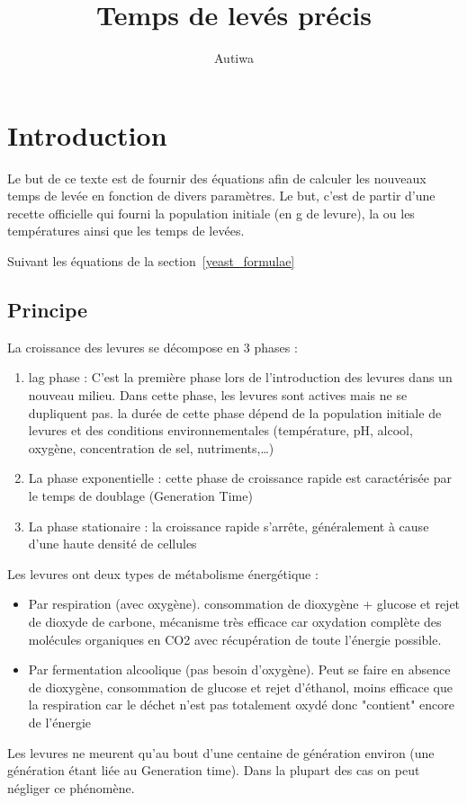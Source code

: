 \documentclass[a4paper,twoside]{article}
\title{Temps de levés précis}
\author{Autiwa}
\begin{document}

\tableofcontents
\newpage
\section{Introduction}
Le but de ce texte est de fournir des équations afin de calculer les nouveaux temps de levée en fonction de divers paramètres. Le but, c'est de partir d'une recette officielle qui fourni la population initiale (en g de levure), la ou les températures ainsi que les temps de levées. 

Suivant les équations de la section~\ref{yeast_formulae}
\subsection{Principe}
La croissance des levures se décompose en 3 phases :
\begin{enumerate}
\item lag phase : C'est la première phase lors de l'introduction des levures dans un nouveau milieu. Dans cette phase, les levures sont actives mais ne se dupliquent pas. la durée de cette phase dépend de la population initiale de levures et des conditions environnementales (température, pH, alcool, oxygène, concentration de sel, nutriments,\dots)
\item La phase exponentielle : cette phase de croissance rapide est caractérisée par le temps de doublage (Generation Time)
\item La phase stationaire : la croissance rapide s'arrête, généralement à cause d'une haute densité de cellules
\end{enumerate}


Les levures ont deux types de métabolisme énergétique :
\begin{itemize}
\item Par respiration (avec oxygène). consommation de dioxygène + glucose et
rejet de dioxyde de carbone, mécanisme très efficace car oxydation
complète des molécules organiques en CO2 avec récupération de toute
l'énergie possible.
\item Par fermentation alcoolique (pas besoin d'oxygène). Peut se
faire en absence de dioxygène, consommation de glucose et rejet d'éthanol, moins efficace que la respiration car le déchet n'est pas
totalement oxydé donc "contient" encore de l'énergie
\end{itemize}

\begin{remarque}
Les levures ne meurent qu'au bout d'une centaine de génération environ (une génération étant liée au Generation time). Dans la plupart des cas on peut négliger ce phénomène. 
\end{remarque}
\end{document}
